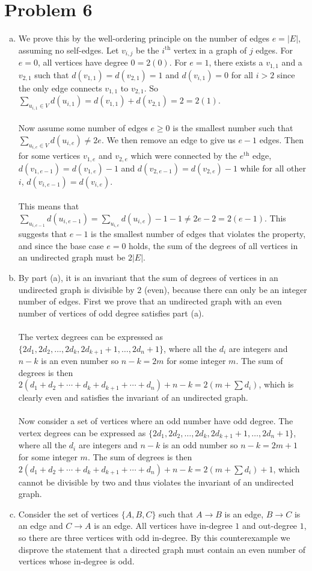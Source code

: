 \documentclass[11pt]{article}
\newcounter{problemnumber}
\begin{document}
\section*{Problem 6}
\begin{enumerate}[(a)]
\item We prove this by the well-ordering principle on the number of edges $e=|E|$, assuming no self-edges. Let $v_{i,j}$ be the $i^{\text{th}}$ vertex in a graph of $j$ edges. For $e=0$, all vertices have degree $0 = 2(0)$. For $e=1$, there exists a $v_{1,1}$ and a $v_{2,1}$ such that $d(v_{1,1})=d(v_{2,1})=1$ and $d(v_{i,1})=0$ for all $i>2$ since the only edge connects $v_{1,1}$ to $v_{2,1}$. So $\sum_{u_{i,1} \in V} d(u_{i,1}) = d(v_{1,1})+d(v_{2,1}) = 2 = 2(1)$. \\\\
Now assume some number of edges $e\geq 0$ is the smallest number such that $\sum_{u_{i,e} \in V} d(u_{i,e}) \neq 2e$. We then remove an edge to give us $e-1$ edges. Then for some vertices $v_{1,e}$ and $v_{2,e}$ which were connected by the $e^{\text{th}}$ edge, $d(v_{1,e-1}) = d(v_{1,e})-1$ and $d(v_{2,e-1}) = d(v_{2,e})-1$ while for all other $i$, $d(v_{i,e-1}) = d(v_{i,e})$. \\\\
This means that $\sum_{u_{i,e-1}} d(u_{i,e-1}) = \sum_{u_{i,e}} d(u_{i,e})-1-1 \neq 2e-2 = 2(e-1)$. This suggests that $e-1$ is the smallest number of edges that violates the property, and since the base case $e=0$ holds, the sum of the degrees of all vertices in an undirected graph must be $2|E|$.
\item By part (a), it is an invariant that the sum of degrees of vertices in an undirected graph is divisible by 2 (even), because there can only be an integer number of edges. First we prove that an undirected graph with an even number of vertices of odd degree satisfies part (a). \\\\
The vertex degrees can be expressed as $\{2d_1,2d_2,\ldots,2d_k,2d_{k+1}+1,\ldots,2d_n+1\}$, where all the $d_i$ are integers and $n-k$ is an even number so $n-k=2m$ for some integer $m$. The sum of degrees is then $2(d_1+d_2+\cdots+d_k+d_{k+1}+\cdots+d_n)+n-k = 2(m+\sum d_i)$, which is clearly even and satisfies the invariant of an undirected graph. \\\\
Now consider a set of vertices where an odd number have odd degree. The vertex degrees can be expressed as $\{2d_1,2d_2,\ldots,2d_k,2d_{k+1}+1,\ldots,2d_n+1\}$, where all the $d_i$ are integers and $n-k$ is an odd number so $n-k=2m+1$ for some integer $m$. The sum of degrees is then $2(d_1+d_2+\cdots+d_k+d_{k+1}+\cdots+d_n)+n-k = 2(m+\sum d_i)+1$, which cannot be divisible by two and thus violates the invariant of an undirected graph.
\item Consider the set of vertices $\{A,B,C\}$ such that $A\rightarrow B$ is an edge, $B\rightarrow C$ is an edge and $C\rightarrow A$ is an edge. All vertices have in-degree $1$ and out-degree $1$, so there are three vertices with odd in-degree. By this counterexample we disprove the statement that a directed graph must contain an even number of vertices whose in-degree is odd. 
\end{enumerate}
\end{document}
